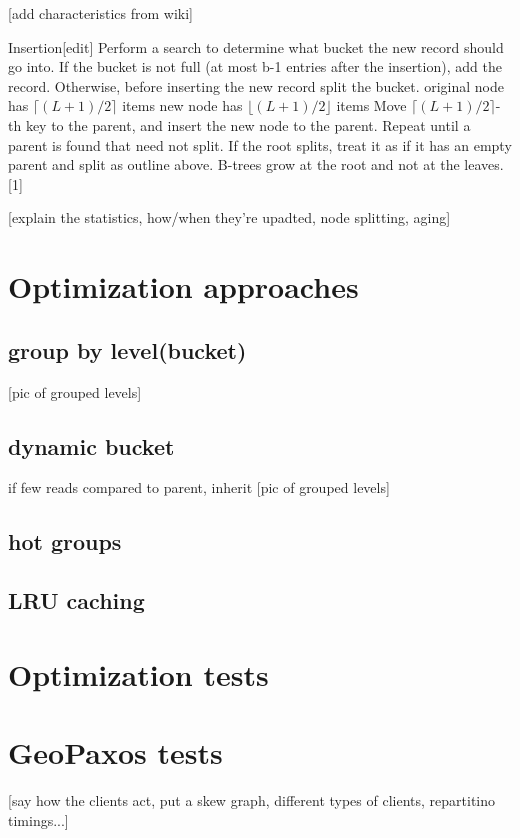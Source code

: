 [add characteristics from wiki]

Insertion[edit]
Perform a search to determine what bucket the new record should go into.
If the bucket is not full (at most b-1 entries after the insertion), add the record.
Otherwise, before inserting the new record
split the bucket.
original node has $\lceil(L+1)/2\rceil$ items
new node has $\lfloor(L+1)/2\rfloor$ items
Move $\lceil(L+1)/2\rceil$-th key to the parent, and insert the new node to the parent.
Repeat until a parent is found that need not split.
If the root splits, treat it as if it has an empty parent and split as outline above.
B-trees grow at the root and not at the leaves.[1]


[explain the statistics, how/when they're upadted, node splitting, aging]
\section{Optimization approaches}\label{sec:optimization-approaches}

\subsection{group by level(bucket)}\label{sec:fixed-size buckets}
[pic of grouped levels]

\subsection{dynamic bucket}\label{sec:variable-size buckets}
if few reads compared to parent, inherit
[pic of grouped levels]

\subsection{hot groups}\label{sec:hot-groups}

\subsection{LRU caching}\label{sec:LRU caching}

\section{Optimization tests}\label{sec:optimization-tests}

\section{GeoPaxos tests}\label{sec:geopaxos-tests}
[say how the clients act, put a skew graph, different types of clients, repartitino timings...]